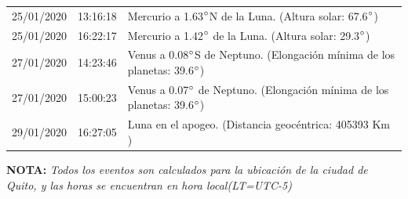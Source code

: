 \documentclass[12pt,a4paper,oneside]{article}
\begin{document}
\begin{center}
\begin{tabular}{ |l| l| l| }
25/01/2020 &  13:16:18   &  Mercurio a 1.63$\degree$N de la Luna. (Altura solar: 67.6$\degree$)	  \\
25/01/2020 &  16:22:17   &  Mercurio a 1.42$\degree$ de la Luna. (Altura solar: 29.3$\degree$)	  \\
27/01/2020 &  14:23:46   &  Venus a 0.08$\degree$S de Neptuno. (Elongación mínima de los planetas: 39.6$\degree$)	  \\
27/01/2020 &  15:00:23   &  Venus a 0.07$\degree$ de Neptuno. (Elongación mínima de los planetas: 39.6$\degree$)	  \\
29/01/2020 &  16:27:05   &  Luna en el apogeo. (Distancia geocéntrica: 405393 Km )\\
\hline
\end{tabular}
\end{center}
\textbf{NOTA:  }\textit{Todos los eventos son calculados para la ubicaci\'on de la ciudad de Quito, y las horas se encuentran en hora local(LT=UTC-5)}
\newpage
\end{document}
